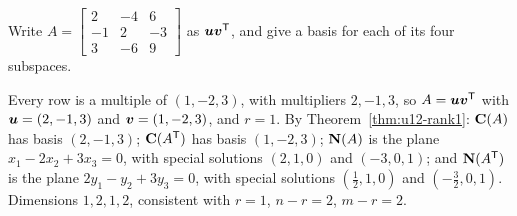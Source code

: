 \begin{exercise}\label{exr:u12-uvT}
Write $A=\begin{bmatrix}2&-4&6\\-1&2&-3\\3&-6&9\end{bmatrix}$ as $\boldsymbol{u}\boldsymbol{v}^{\mathsf{T}}$, and give a basis
for each of its four subspaces.
\end{exercise}
\begin{solution}
Every row is a multiple of $(1,-2,3)$, with multipliers $2,-1,3$, so
$A=\boldsymbol{u}\boldsymbol{v}^{\mathsf{T}}$ with $\boldsymbol{u}=(2,-1,3)$ and $\boldsymbol{v}=(1,-2,3)$, and $r=1$. By
Theorem~\ref{thm:u12-rank1}: $\mathbf{C}(A)$ has basis $(2,-1,3)$; $\mathbf{C}(A^{\mathsf{T}})$ has basis $(1,-2,3)$;
$\mathbf{N}(A)$ is the plane $x_1-2x_2+3x_3=0$, with special solutions $(2,1,0)$ and $(-3,0,1)$; and
$\mathbf{N}(A^{\mathsf{T}})$ is the plane $2y_1-y_2+3y_3=0$, with special solutions $(\tfrac12,1,0)$ and
$(-\tfrac32,0,1)$. Dimensions $1,2,1,2$, consistent with $r=1$, $n-r=2$, $m-r=2$.
\end{solution}
